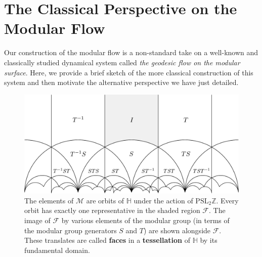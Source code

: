 \documentclass[12pt,twoside]{reedthesis}
\theoremstyle{definition}
\newcommand{\Z}{\mathbb{Z}}
\newcommand{\PSLZ}{\mathrm{PSL}_2{\Z}}
\newcommand{\defnphrase}[1]{\textbf{#1}}
\begin{document}
\section{The Classical Perspective on the Modular Flow}

Our construction of the modular flow is a non-standard take on a well-known and classically studied dynamical system called \emph{the geodesic flow on the modular surface}.
Here, we provide a brief sketch of the more classical construction of this system and then motivate the alternative perspective we have just detailed.

\begin{figure}[b!]
  \centering
  \includegraphics[width=0.8\linewidth]{figures/tessellation.pdf}
  \caption{The elements of $\mathcal{M}$ are orbits of $\mathbb{H}$ under the action of $\PSLZ$. Every orbit has exactly one representative in the shaded region $\mathcal{F}$. The image of $\mathcal{F}$ by various elements of the modular group (in terms of the modular group generators $S$ and $T$) are shown alongside $\mathcal{F}$. These translates are called \defnphrase{faces} in a \defnphrase{tessellation} of $\mathbb{H}$ by its fundamental domain.}
  \label{fig:tessellation}
\end{figure}
\end{document}
